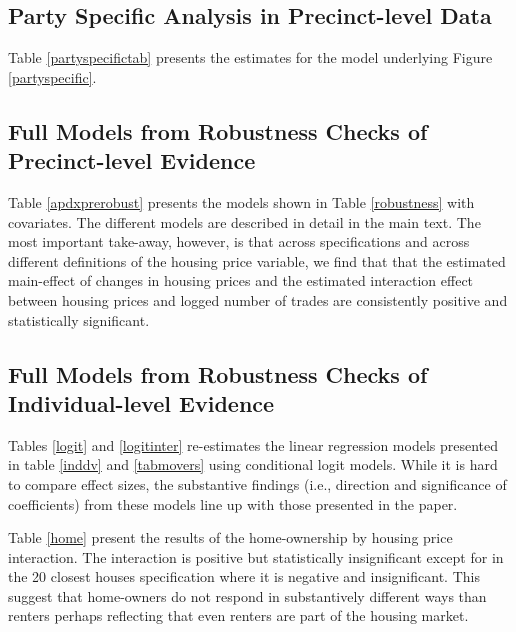 \documentclass[12pt,a4paper]{article}
\begin{document}
			
			\subsection{Party Specific Analysis in Precinct-level Data} \label{app_partyspec}
			\setcounter{table}{0}
			
			Table \ref{partyspecifictab} presents the estimates for the model underlying Figure \ref{partyspecific}.

			
			
			
			\newpage
			
			\subsection{Full Models from Robustness Checks of Precinct-level Evidence} \label{app_robustpred}
			\setcounter{table}{0}
			
			Table \ref{apdxprerobust} presents the models shown in Table \ref{robustness} with covariates. The different models are described in detail in the main text. The most important take-away, however, is that across specifications and across different definitions of the housing price variable, we find that that the estimated main-effect of changes in housing prices  and the estimated interaction effect between housing prices and logged number of trades are consistently positive and statistically significant.
			
			
			 
			
			\newpage
			
			\subsection{Full Models from Robustness Checks of Individual-level Evidence} \label{app_robustind}
			
			\setcounter{table}{0}
			
			Tables \ref{logit} and \ref{logitinter} re-estimates the linear regression models presented in table \ref{inddv} and \ref{tabmovers} using conditional logit models. While it is hard to compare effect sizes, the substantive findings (i.e., direction and significance of coefficients) from these models line up with those presented in the paper.
			
			Table  \ref{home} present the results of the home-ownership by housing price interaction. The interaction is positive but statistically insignificant except for in the 20 closest houses specification where it is negative and insignificant. This suggest that home-owners do not respond in substantively different ways than renters perhaps reflecting that even renters are part of the housing market.
			
\end{document}
